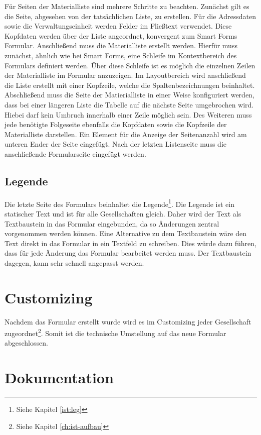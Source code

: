 Für Seiten der Materialliste sind mehrere Schritte zu beachten. Zunächst gilt es die Seite, abgesehen von der tatsächlichen Liste, zu erstellen. Für die Adressdaten sowie die Verwaltungseinheit werden Felder im Fließtext verwendet. Diese Kopfdaten werden über der Liste angeordnet, konvergent zum Smart Forms Formular. Anschließend muss die Materialliste erstellt werden. Hierfür muss zunächst, ähnlich wie bei Smart Forms, eine Schleife im Kontextbereich des Formulars definiert werden. Über diese Schleife ist es möglich die einzelnen Zeilen der Materialliste im Formular anzuzeigen. Im Layoutbereich wird anschließend die Liste erstellt mit einer Kopfzeile, welche die Spaltenbezeichnungen beinhaltet. Abschließend muss die Seite der Matierialliste in einer Weise konfiguriert werden, dass bei einer längeren Liste die Tabelle auf die nächste Seite umgebrochen wird. Hiebei darf kein Umbruch innerhalb einer Zeile möglich sein. Des Weiteren muss jede benötigte Folgeseite ebenfalls die Kopfdaten sowie die Kopfzeile der Materialliste darstellen. Ein Element für die Anzeige der Seitenanzahl wird am unteren Ender der Seite eingefügt. Nach der letzten Listenseite muss die anschließende Formularseite eingefügt werden.

\subsection{Legende}
Die letzte Seite des Formulars beinhaltet die Legende\footnote{Siehe Kapitel \ref{ist:leg}}.
Die Legende ist ein statischer Text und ist für alle Gesellschaften gleich. Daher wird der Text als Textbaustein in das Formular eingebunden, da so Änderungen zentral vorgenommen werden können. Eine Alternative zu dem Textbaustein wäre den Text direkt in das Formular in ein Textfeld zu schreiben. Dies würde dazu führen, dass für jede Änderung das Formular bearbeitet werden muss. Der Textbaustein dagegen, kann sehr schnell angepasst werden.



\section{Customizing}

Nachdem das Formular erstellt wurde wird es im Customizing jeder Gesellschaft zugeordnet\footnote{Siehe Kapitel \ref{ch:ist-aufbau}}. Somit ist die technische Umstellung auf das neue Formular abgeschlossen.



\section{Dokumentation}

